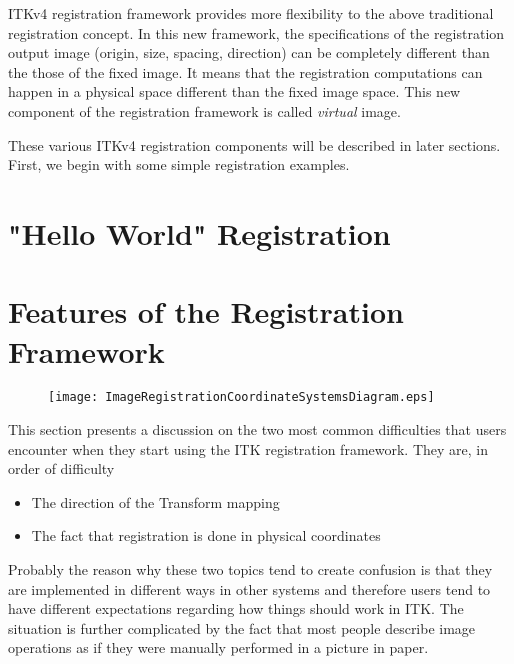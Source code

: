ITKv4 registration framework provides more flexibility to the above traditional
registration concept. In this new framework, the specifications of the registration
output image (origin, size, spacing, direction) can be completely different than
the those of the fixed image. It means that the registration computations can happen
in a physical space different than the fixed image space. This new component of the
registration framework is called \emph{virtual} image.

These various ITKv4 registration components will be described in later
sections.  First, we begin with some simple registration examples.

\section{"Hello World" Registration}
\label{sec:IntroductionImageRegistration}
\ifitkFullVersion

\fi

\section{Features of the Registration Framework}
\label{sec:FeaturesOfTheRegistrationFramework}

\begin{figure}
\center
\texttt{[image: ImageRegistrationCoordinateSystemsDiagram.eps]}
\label{fig:ImageRegistrationCoordinateSystemsDiagram}
\end{figure}


This section presents a discussion on the two most common difficulties that
users encounter when they start using the ITK registration framework. They are,
in order of difficulty

\begin{itemize}
\item The direction of the Transform mapping
\item The fact that registration is done in physical coordinates
\end{itemize}

Probably the reason why these two topics tend to create confusion is that they
are implemented in different ways in other systems and therefore users tend to
have different expectations regarding how things should work in ITK. The
situation is further complicated by the fact that most people describe image
operations as if they were manually performed in a picture in paper.

